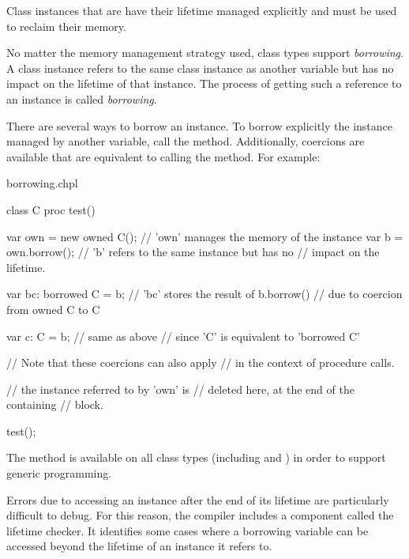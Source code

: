 Class instances that are  have their lifetime managed
explicitly and  must be used to reclaim their memory.

No matter the memory management strategy used, class types support
\emph{borrowing}.
A  class instance refers to the same class instance as
another variable but has no impact on the lifetime of that instance. The
process of getting such a reference to an instance is called
\emph{borrowing}.

There are several ways to borrow an instance. To borrow explicitly the
instance managed by another variable, call the  method.
Additionally, coercions are available that are equivalent to calling the
 method.  For example:

\begin{chapelexample}{borrowing.chpl}
\begin{chapel}
class C { }
proc test() {
  var own = new owned C(); // 'own' manages the memory of the instance
  var b = own.borrow();    // 'b' refers to the same instance but has no
                           // impact on the lifetime.

  var bc: borrowed C = b;  // 'bc' stores the result of b.borrow()
                           // due to coercion from owned C to C

  var c: C = b;            // same as above
                           // since 'C' is equivalent to 'borrowed C'

                           // Note that these coercions can also apply
                           // in the context of procedure calls.

                           // the instance referred to by 'own' is
                           // deleted here, at the end of the containing
                           // block.
}
\end{chapel}
\begin{chapelpost}
test();
\end{chapelpost}
\begin{chapeloutput}
\end{chapeloutput}
\end{chapelexample}

The  method is available on all class types (including
 and ) in order to support generic
programming.

Errors due to accessing an instance after the end of its lifetime are
particularly difficult to debug. For this reason, the compiler includes a
component called the lifetime checker. It identifies some cases where a
borrowing variable can be accessed beyond the lifetime of an instance it
refers to.

